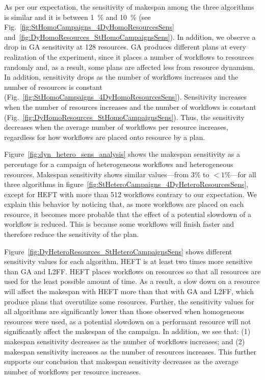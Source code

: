 As per our expectation, the sensitivity of makespan among the three algorithms
is similar and it is between 1~\% and 10~\% (see
Fig.~\ref{fig:StHomoCampaigns_4DyHomoResourcesSens}
and~\ref{fig:DyHomoResources_StHomoCampaignsSens}). In addition, we observe a
drop in GA sensitivity at 128 resources. GA produces different plans at every
realization of the experiment, since it places a number of workflows to
resources randomly and, as a result, some plans are affected less from resource
dynamism. In addition, sensitivity drops as the number of workflows increases
and the number of resources is constant
(Fig.~\ref{fig:StHomoCampaigns_4DyHomoResourcesSens}). Sensitivity increases
when the number of resources increases and the number of workflows is constant
(Fig.~\ref{fig:DyHomoResources_StHomoCampaignsSens}). Thus, the sensitivity
decreases when the average number of workflows per resource increases,
regardless for how workflows are placed onto resource by a plan.

Figure~\ref{fig:dyn_hetero_sens_analysis} shows the makespan sensitivity as a
percentage for a campaign of heterogeneous workflows and heterogeneous
resources. Makespan sensitivity shows similar values---from 3\% to $<1$\%---for
all three algorithms in
figure~\ref{fig:StHeteroCampaigns_4DyHeteroResourcesSens}, except for HEFT with
more than 512 workflows contrary to our expectation. We explain this behavior by
noticing that, as more workflows are placed on each resource, it becomes more
probable that the effect of a potential slowdown of a workflow is reduced. This
is because some workflows will finish faster and therefore reduce the
sensitivity of the plan.

Figure~\ref{fig:DyHeteroResources_StHeteroCampaignsSens} shows different
sensitivity values for each algorithm. HEFT is at least two times more sensitive
than GA and L2FF. HEFT places workflows on resources so that all resources are
used for the least possible amount of time. As a result, a slow down on a
resource will affect the makespan with HEFT more than that with GA and L2FF,
which produce plans that overutilize some resources. Further, the sensitivity
values for all algorithms are significantly lower than those observed when
homogeneous resources were used, as a potential slowdown on a performant
resource will not significantly affect the makespan of the campaign. In
addition, we see that: (1) makespan sensitivity decreases as the number of
workflows increases; and (2) makespan sensitivity increases as the number of
resources increases. This further supports our conclusion that makespan
sensitivity decreases as the average number of workflows per resource increases.

